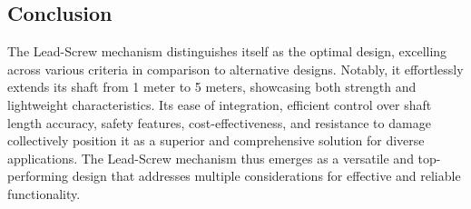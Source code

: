\documentclass[a4,10pt]{report}
\begin{document}
\subsection{Conclusion}
The Lead-Screw mechanism distinguishes itself as the optimal design, excelling across various criteria in comparison to alternative designs. Notably, it effortlessly extends its shaft from 1 meter to 5 meters, showcasing both strength and lightweight characteristics. Its ease of integration, efficient control over shaft length accuracy, safety features, cost-effectiveness, and resistance to damage collectively position it as a superior and comprehensive solution for diverse applications. The Lead-Screw mechanism thus emerges as a versatile and top-performing design that addresses multiple considerations for effective and reliable functionality.
\end{document}
